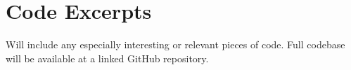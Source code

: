 \chapter{Code Excerpts}\label{app:code_excerpts}
    Will include any especially interesting or relevant pieces of code. Full codebase will be available at a linked GitHub repository.